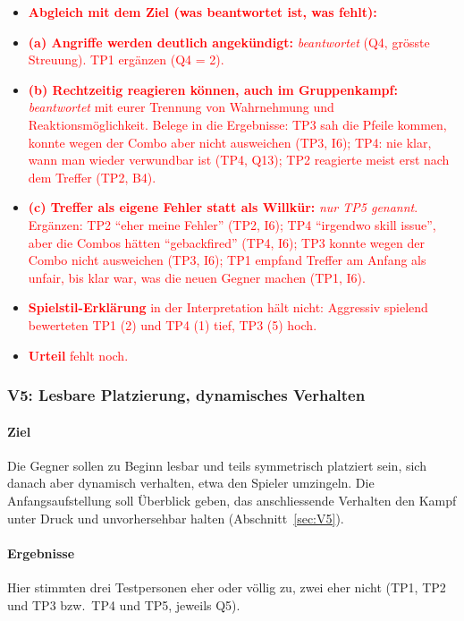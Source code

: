 \documentclass[../Main.tex]{subfiles}
\begin{document}
\begin{itemize}[leftmargin=1.5cm]
    \item \textcolor{red}{\textbf{Abgleich mit dem Ziel (was beantwortet ist, was fehlt):}}
    \item \textcolor{red}{\textbf{(a) Angriffe werden deutlich angekündigt:} \emph{beantwortet} (Q4, grösste Streuung). TP1 ergänzen (Q4 = 2).}
    \item \textcolor{red}{\textbf{(b) Rechtzeitig reagieren können, auch im Gruppenkampf:} \emph{beantwortet} mit eurer Trennung von Wahrnehmung und Reaktionsmöglichkeit. Belege in die Ergebnisse: TP3 sah die Pfeile kommen, konnte wegen der Combo aber nicht ausweichen (TP3, I6); TP4: nie klar, wann man wieder verwundbar ist (TP4, Q13); TP2 reagierte meist erst nach dem Treffer (TP2, B4).}
    \item \textcolor{red}{\textbf{(c) Treffer als eigene Fehler statt als Willkür:} \emph{nur TP5 genannt}. Ergänzen: TP2 \enquote{eher meine Fehler} (TP2, I6); TP4 \enquote{irgendwo skill issue}, aber die Combos hätten \enquote{gebackfired} (TP4, I6); TP3 konnte wegen der Combo nicht ausweichen (TP3, I6); TP1 empfand Treffer am Anfang als unfair, bis klar war, was die neuen Gegner machen (TP1, I6).}
    \item \textcolor{red}{\textbf{Spielstil-Erklärung} in der Interpretation hält nicht: Aggressiv spielend bewerteten TP1 (2) und TP4 (1) tief, TP3 (5) hoch.}
    \item \textcolor{red}{\textbf{Urteil} fehlt noch.}
\end{itemize}

\subsubsection{V5: Lesbare Platzierung, dynamisches Verhalten}

\paragraph{Ziel}
Die Gegner sollen zu Beginn lesbar und teils symmetrisch platziert sein, sich danach aber dynamisch verhalten, etwa den Spieler umzingeln. Die Anfangsaufstellung soll Überblick geben, das anschliessende Verhalten den Kampf unter Druck und unvorhersehbar halten (Abschnitt~\ref{sec:V5}).

\paragraph{Ergebnisse}
Hier stimmten drei Testpersonen eher oder völlig zu, zwei eher nicht (TP1, TP2 und TP3 bzw.\ TP4 und TP5, jeweils Q5).
\end{document}
